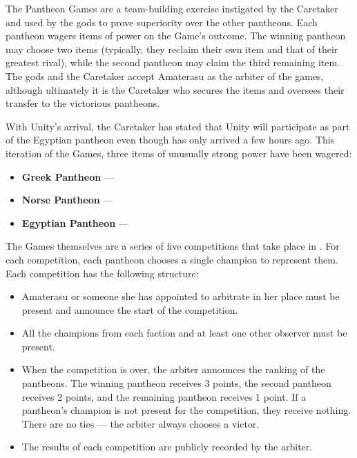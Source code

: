 \documentclass[green]{guardians}
\begin{document}
\name{\gPantheonGames{}}

The Pantheon Games are a team-building exercise instigated by the Caretaker and used by the gods to prove superiority over the other pantheons. Each pantheon wagers items of power on the Game's outcome. The winning pantheon may choose two items (typically, they reclaim their own item and that of their greatest rival), while the second pantheon may claim the third remaining item. The gods and the Caretaker accept Amaterasu as the arbiter of the games, although ultimately it is the Caretaker who secures the items and oversees their transfer to the victorious pantheons.

With Unity's arrival, the Caretaker has stated that Unity will participate as part of the Egyptian pantheon even though \cUnity{\they} has only arrived a few hours ago. This iteration of the Games, three items of unusually strong power have been wagered:

\begin{itemize}
  \item \textbf{Greek Pantheon} --- \iSandals{}
  \item \textbf{Norse Pantheon} --- \iHammer{}
	\item \textbf{Egyptian Pantheon} --- \iNecro{}
\end{itemize}

The Games themselves are a series of five competitions that take place in \pAmphitheater{}. For each competition, each pantheon chooses a single champion to represent them. Each competition has the following structure:

\begin{itemize}
  \item Amaterasu or someone she has appointed to arbitrate in her place must be present and announce the start of the competition.
	\item All the champions from each faction and at least one other observer must be present.
	\item When the competition is over, the arbiter announces the ranking of the pantheons. The winning pantheon receives 3 points, the second pantheon receives 2 points, and the remaining pantheon receives 1 point. If a pantheon's champion is not present for the competition, they receive nothing. There are no ties --- the arbiter always chooses a victor.
	\item The results of each competition are publicly recorded by the arbiter.
\end{itemize}
 
\end{document}

